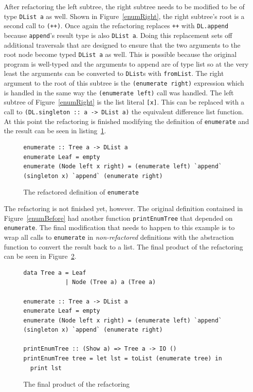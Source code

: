 After refactoring the left subtree, the right subtree needs to be modified to be of type \texttt{DList a} as well. Shown in Figure~\ref{enumRight}, the right subtree's root is a second call to \texttt{(++)}. Once again the refactoring replaces \texttt{++} with \texttt{DL.append} because \texttt{append}'s result type is also \texttt{DList a}. Doing this replacement sets off additional traversals that are designed to ensure that the two arguments to the root node become typed \texttt{DList a} as well. This is possible because the original program is well-typed and the arguments to append are of type list so at the very least the arguments can be converted to \texttt{DList}s with \texttt{fromList}. The right argument to the root of this subtree is the \texttt{(enumerate right)} expression which is handled in the same way the \texttt{(enumerate left)} call was handled. The left subtree of Figure~\ref{enumRight}  is the list literal \texttt{[x]}. This can be replaced with a call to \texttt{(DL.singleton :: a -> DList a)} the equivalent difference list function. At this point the refactoring is finished modifying the definition of \texttt{enumerate} and the result can be seen in listing~\ref{enumRef}.

\begin{figure}[t]
\begin{lstlisting}
enumerate :: Tree a -> DList a
enumerate Leaf = empty
enumerate (Node left x right) = (enumerate left) `append` (singleton x) `append` (enumerate right)
\end{lstlisting}
\caption{The refactored definition of \texttt{enumerate}}
\label{enumRef}
\end{figure}

The refactoring is not finished yet, however. The original definition contained in Figure~\ref{enumBefore} had another function \texttt{printEnumTree} that depended on \texttt{enumerate}. The final modification that needs to happen to this example is to wrap all calls to \texttt{enumerate} in \textit{non-refactored} definitions with the abstraction function to convert the result back to a list. The final product of the refactoring can be seen in Figure~\ref{enumFinal}.

\begin{figure}[t]
\begin{lstlisting}
data Tree a = Leaf
            | Node (Tree a) a (Tree a)

enumerate :: Tree a -> DList a
enumerate Leaf = empty
enumerate (Node left x right) = (enumerate left) `append` (singleton x) `append` (enumerate right)

printEnumTree :: (Show a) => Tree a -> IO ()
printEnumTree tree = let lst = toList (enumerate tree) in
  print lst
\end{lstlisting}
\caption{The final product of the refactoring}
\label{enumFinal}
\end{figure}

